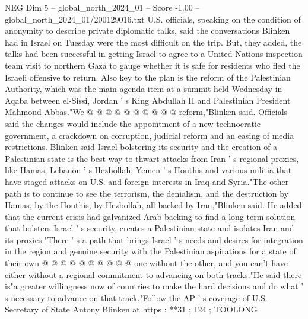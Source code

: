 \begin{textsample}{NEG Dim 5 – global\_north\_2024\_01 – Score -1.00 – global\_north\_2024\_01/200129016.txt}
U.S. officials, speaking on the condition of anonymity to describe private diplomatic talks, said the conversations Blinken had in Israel on Tuesday were the most difficult on the trip.
But, they added, the talks had been successful in getting Israel to agree to a United Nations inspection team visit to northern Gaza to gauge whether it is safe for residents who fled the Israeli offensive to return.
Also key to the plan is the reform of the Palestinian Authority, which was the main agenda item at a summit held Wednesday in Aqaba between el-Sissi, Jordan ' s King Abdullah II and Palestinian President Mahmoud Abbas."We @ @ @ @ @ @ @ @ @ @ reform,"Blinken said.
Officials said the changes would include the appointment of a new technocratic government, a crackdown on corruption, judicial reform and an easing of media restrictions.
Blinken said Israel bolstering its security and the creation of a Palestinian state is the best way to thwart attacks from Iran ' s regional proxies, like Hamas, Lebanon ' s Hezbollah, Yemen ' s Houthis and various militia that have staged attacks on U.S. and foreign interests in Iraq and Syria."The other path is to continue to see the terrorism, the denialism, and the destruction by Hamas, by the Houthis, by Hezbollah, all backed by Iran,"Blinken said.
He added that the current crisis had galvanized Arab backing to find a long-term solution that bolsters Israel ' s security, creates a Palestinian state and isolates Iran and its proxies."There ' s a path that brings Israel ' s needs and desires for integration in the region and genuine security with the Palestinian aspirations for a state of their own @ @ @ @ @ @ @ @ @ @ one without the other, and you can't have either without a regional commitment to advancing on both tracks."He said there is"a greater willingness now of countries to make the hard decisions and do what ' s necessary to advance on that track."Follow the AP ' s coverage of U.S.
Secretary of State Antony Blinken at https : **31 ; 124 ; TOOLONG

\end{textsample}
